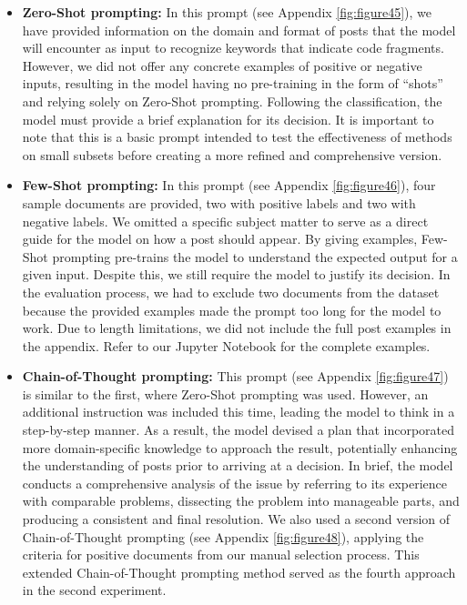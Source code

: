 \documentclass[english,bachelor]{swsLeipzig}
\begin{document}
\begin{itemize}
  \item \textbf{Zero-Shot prompting:} In this prompt (see Appendix \ref{fig:figure45}), we have provided information on the domain and format of posts that the model will encounter as input to recognize keywords that indicate code fragments. However, we did not offer any concrete examples of positive or negative inputs, resulting in the model having no pre-training in the form of ``shots'' and relying solely on Zero-Shot prompting. Following the classification, the model must provide a brief explanation for its decision. It is important to note that this is a basic prompt intended to test the effectiveness of methods on small subsets before creating a more refined and comprehensive version.
  \item \textbf{Few-Shot prompting:} In this prompt (see Appendix \ref{fig:figure46}), four sample documents are provided, two with positive labels and two with negative labels. We omitted a specific subject matter to serve as a direct guide for the model on how a post should appear. By giving examples, Few-Shot prompting pre-trains the model to understand the expected output for a given input. Despite this, we still require the model to justify its decision. In the evaluation process, we had to exclude two documents from the dataset because the provided examples made the prompt too long for the model to work. Due to length limitations, we did not include the full post examples in the appendix. Refer to our Jupyter Notebook for the complete examples.
  \item \textbf{Chain-of-Thought prompting:} This prompt (see Appendix \ref{fig:figure47}) is similar to the first, where Zero-Shot prompting was used.  However, an additional instruction was included this time, leading the model to think in a step-by-step manner. As a result, the model devised a plan that incorporated more domain-specific knowledge to approach the result, potentially enhancing the understanding of posts prior to arriving at a decision. In brief, the model conducts a comprehensive analysis of the issue by referring to its experience with comparable problems, dissecting the problem into manageable parts, and producing a consistent and final resolution. We also used a second version of Chain-of-Thought prompting (see Appendix \ref{fig:figure48}), applying the criteria for positive documents from our manual selection process. This extended Chain-of-Thought prompting method served as the fourth approach in the second experiment.
\end{itemize}
\end{document}
